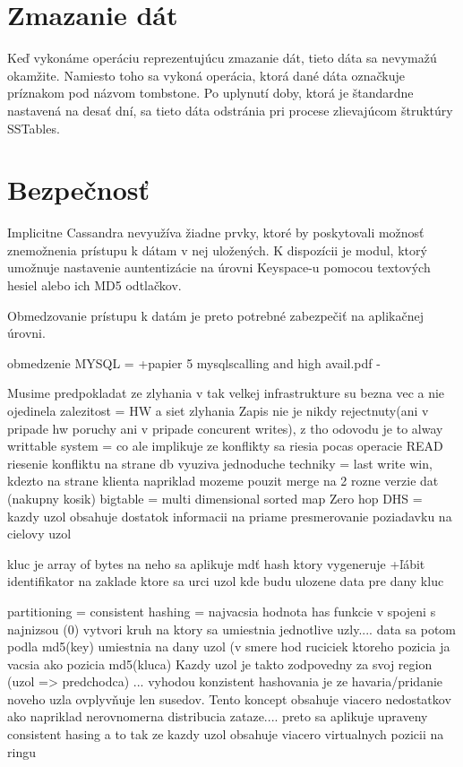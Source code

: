 \documentclass[11pt,twoside,a4paper]{book}
\begin{document}
\section{Zmazanie dát}
Keď vykonáme operáciu reprezentujúcu zmazanie dát, tieto dáta sa nevymažú okamžite. Namiesto toho sa vykoná operácia, ktorá dané dáta označkuje príznakom pod názvom tombstone. Po uplynutí doby, ktorá je štandardne nastavená na desať dní, sa tieto dáta odstránia pri procese zlievajúcom štruktúry SSTables.


\section{Bezpečnosť}

Implicitne Cassandra nevyužíva žiadne prvky, ktoré by poskytovali možnosť znemožnenia prístupu k dátam v nej uložených. K dispozícii je modul, ktorý umožnuje nastavenie auntentizácie na úrovni Keyspace-u pomocou textových hesiel alebo ich MD5 odtlačkov. 

Obmedzovanie prístupu k datám je preto potrebné zabezpečiť na aplikačnej úrovni.




obmedzenie MYSQL = +papier 5
mysqlscalling and high avail.pdf -



Musime predpokladat ze zlyhania v tak velkej infrastrukture su bezna vec a nie ojedinela zalezitost = HW a siet zlyhania
Zapis nie je nikdy rejectnuty(ani v pripade hw poruchy ani v pripade concurent writes),  z tho odovodu je to alway writtable system = co ale implikuje ze konflikty sa riesia pocas operacie READ
  riesenie konfliktu na strane db vyuziva jednoduche techniky = last write win, kdezto na strane klienta napriklad mozeme pouzit merge na 2 rozne verzie dat (nakupny kosik)
bigtable = multi dimensional sorted map
Zero hop DHS = kazdy uzol obsahuje dostatok informacii na priame presmerovanie poziadavku na cielovy uzol 

kluc je array of bytes na neho sa aplikuje mdť hash ktory vygeneruje +ľábit identifikator na zaklade ktore sa urci uzol kde budu ulozene data pre dany kluc

partitioning = consistent hashing = najvacsia hodnota has funkcie v spojeni s najnizsou (0) vytvori kruh na ktory sa umiestnia jednotlive uzly.... data sa potom podla md5(key) umiestnia na dany uzol (v smere hod ruciciek ktoreho  pozicia ja vacsia ako pozicia md5(kluca) Kazdy uzol je takto zodpovedny za svoj region (uzol => predchodca) ... vyhodou konzistent hashovania je ze havaria/pridanie noveho uzla ovplyvňuje len susedov. Tento koncept obsahuje viacero nedostatkov ako napriklad nerovnomerna distribucia zataze.... 
preto sa aplikuje upraveny consistent hasing a to tak ze kazdy uzol obsahuje viacero virtualnych pozicii na ringu
\end{document}
